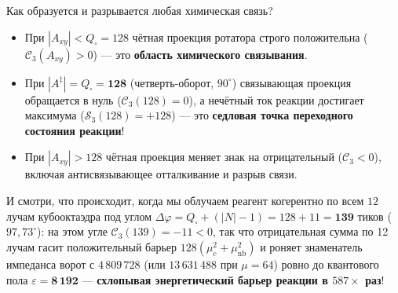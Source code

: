 Как образуется и разрывается любая химическая связь?
\begin{itemize}[noitemsep]
\item При $|A_{xy}| < Q_\square = 128$ чётная проекция ротатора строго положительна ($\mathcal{C}_3(A_{xy}) > 0$) --- это \textbf{область химического связывания}.
\item При $|A^\ddagger| = Q_\square = \mathbf{128}$ (четверть-оборот, $90^\circ$) связывающая проекция обращается в нуль ($\mathcal{C}_3(128) = 0$), а нечётный ток реакции достигает максимума ($\mathcal{S}_3(128) = +128$) --- это \textbf{седловая точка переходного состояния реакции}!
\item При $|A_{xy}| > 128$ чётная проекция меняет знак на отрицательный ($\mathcal{C}_3 < 0$), включая антисвязывающее отталкивание и разрыв связи.
\end{itemize}
И смотри, что происходит, когда мы облучаем реагент когерентно по всем $12$ лучам кубооктаэдра под углом $\Delta\varphi = Q_\square + (|N|-1) = 128 + 11 = \mathbf{139\text{ тиков}}$ ($97{,}73^\circ$): на этом угле $\mathcal{C}_3(139) = -11 < 0$, так что отрицательная сумма по 12 лучам гасит положительный барьер $128(\mu_c^2 + \mu_{\mathrm{nb}}^2)$ и роняет знаменатель импеданса ворот с $4\,809\,728$ (или $13\,631\,488$ при $\mu=64$) ровно до квантового пола $\varepsilon = \mathbf{8\,192}$ --- \textbf{схлопывая энергетический барьер реакции в $587\times$ раз}!

